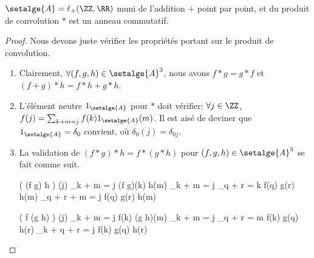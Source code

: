
\begin{fact}
	$\setalge{A} = \ell_{+}(\ZZ , \RR)$
	muni de l'addition $+$ point par point, et du produit de convolution $\ast$
	est un anneau commutatif.
\end{fact}


\begin{proof}
	Nous devons juste vérifier les propriétés portant sur le produit de convolution.
	\begin{enumerate}
		\item Clairement,
		$\forall (f,g,h) \in \setalge{A}^3$, nous avons
		$f \ast g = g \ast f$
		et
		$(f + g) \ast h = f \ast h + g \ast h$.


		\item L'élément neutre $1_{\setalge{A}}$ pour $\ast$ doit vérifier:
		$\forall j \in \ZZ$,
		$f(j) = \sum_{k + m = j} f(k) 1_{\setalge{A}}(m)$.
		Il est aisé de deviner que $1_{\setalge{A}} = \delta_0$ convient,
		où $\delta_{0}(j) = \delta_{0j}$.


		\item La validation de
		$(f \ast g) \ast h = f \ast (g \ast h)$
		pour
		$(f,g,h) \in \setalge{A}^3$
		se fait comme suit.

		\begin{multicols}{2}
        	\setlength{\columnseprule}{.75pt}
	
	
    		\begin{stepcalc}[style=ar*]
    			\big( (f \ast g) \ast h \big) (j)
    		\explnext{}
    			\dsum_{k + m = j} (f \ast g)(k) h(m)
    		\explnext{}
    			\dsum_{k + m = j} \dsum_{q + r = k} f(q) g(r) h(m)
    		\explnext{}
    			\dsum_{q + r + m = j} f(q) g(r) h(m)
    		\end{stepcalc}
	
	
    		\begin{stepcalc}[style=ar*]
    			\big( f \ast (g \ast h) \big) (j)
    		\explnext{}
    			\dsum_{k + m = j} f(k) (g \ast h)(m)
    		\explnext{}
    			\dsum_{k + m = j} \dsum_{q + r = m} f(k) g(q) h(r)
    		\explnext{}
    			\dsum_{k + q + r = j} f(k) g(q) h(r)
    		\end{stepcalc}
    	\end{multicols}
	\end{enumerate}
	
	\null\vspace{-8ex}
\end{proof}





